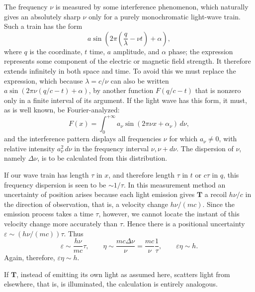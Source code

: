 \documentclass[fontsize=13pt,twoside,openany,headings=normal,parskip=false,bookmarkpackage=false,DIV=calc]{scrbook}
\begin{document}
The frequency $\nu$ is measured by some interference phenomenon, which naturally gives an absolutely sharp $\nu$ only for a purely monochromatic light-wave train. Such a train has the form
\[
a\sin\left(2\pi\left(\frac q\lambda-\nu t\right)+\alpha\right),
\]
where $q$ is the coordinate, $t$ time, $a$ amplitude, and $\alpha$ phase; the expression represents some component of the electric or magnetic field strength. It therefore extends infinitely in both space and time. To avoid this we must replace the expression, which because $\lambda=c/\nu$ can also be written $a\sin(2\pi\nu(q/c-t)+\alpha)$, by another function $F(q/c-t)$ that is nonzero only in a finite interval of its argument. If the light wave has this form, it must, as is well known, be Fourier-analyzed:
\[
F(x)=\int_0^{+\infty}a_\nu\sin(2\pi\nu x+\alpha_\nu)\,d\nu,
\]
\hypertarget{origpage-130}{}%
and the interference pattern displays all frequencies $\nu$ for which $a_\nu\ne0$, with relative intensity $a_\nu^2\,d\nu$ in the frequency interval $\nu,\nu+d\nu$. The dispersion of $\nu$, namely $\Delta\nu$, is to be calculated from this distribution.

If our wave train has length $\tau$ in $x$, and therefore length $\tau$ in $t$ or $c\tau$ in $q$, this frequency dispersion is seen to be $\sim1/\tau$. In this measurement method an uncertainty of position arises because each light emission gives $\boldsymbol{T}$ a recoil $h\nu/c$ in the direction of observation, that is, a velocity change $h\nu/(mc)$. Since the emission process takes a time $\tau$, however, we cannot locate the instant of this velocity change more accurately than $\tau$. Hence there is a positional uncertainty $\varepsilon\sim(h\nu/(mc))\tau$. Thus
\[
\varepsilon\sim\frac{h\nu}{mc}\tau,\qquad
\eta\sim\frac{mc\Delta\nu}\nu=\frac{mc}\nu\frac1\tau,\qquad
\varepsilon\eta\sim h.
\]
Again, therefore, $\varepsilon\eta\sim h$.

If $\boldsymbol{T}$, instead of emitting its own light as assumed here, scatters light from elsewhere, that is, is illuminated, the calculation is entirely analogous.
\end{document}
